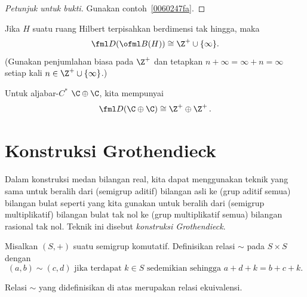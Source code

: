 \begin{proof}[\emph{Petunjuk untuk bukti}] Gunakan contoh~\ref{0060247fa}. \ns
\end{proof}

\begin{exam}\label{0060424} Jika $H$ suatu ruang Hilbert terpisahkan berdimensi tak hingga, maka %
   \[ \fml D(\ofml B(H)) \cong \Z^+ \cup \{\infty\}. \]
(Gunakan penjumlahan biasa pada $\Z^+$ dan tetapkan $n + \infty = \infty + n = \infty$ setiap kali $n
\in \Z^+ \cup \{\infty\}$.)
\end{exam}

\begin{exam}\label{0060427} Untuk aljabar-$C^*$ $\C \oplus \C$, kita mempunyai
   \[ \fml D(\C \oplus \C) \cong \Z^+ \oplus \Z^+\,. \]
\end{exam}


























\section{Konstruksi Grothendieck}
Dalam konstruksi medan bilangan real, kita dapat menggunakan teknik yang sama untuk beralih dari (semigrup aditif) bilangan asli ke
(grup aditif semua) bilangan bulat seperti yang kita gunakan untuk beralih dari (semigrup multiplikatif) bilangan bulat tak nol ke (grup multiplikatif
semua) bilangan rasional tak nol. Teknik ini disebut \emph{konstruksi Grothendieck}.

\begin{defn}\label{0062111} Misalkan $(S,+)$ suatu semigrup komutatif. Definisikan relasi
$\sim$ pada $S \times S$ dengan
   \[ (a,b) \sim (c,d) \text{ jika terdapat $k \in S$ sedemikian sehingga } a + d + k = b + c + k. \]
\end{defn}

\begin{prop}\label{0062114} Relasi $\sim$ yang didefinisikan di atas merupakan relasi ekuivalensi.
\end{prop}

